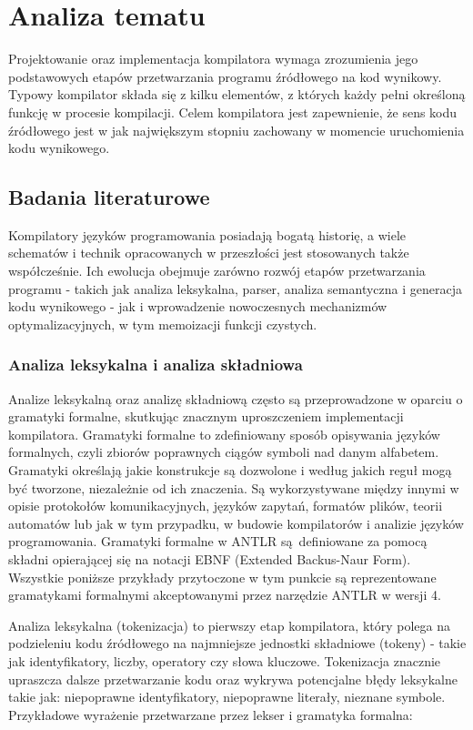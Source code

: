 \chapter{Analiza tematu}
\label{ch:02}

Projektowanie oraz implementacja kompilatora wymaga zrozumienia jego podstawowych etapów przetwarzania programu źródłowego na kod wynikowy. Typowy kompilator składa się z kilku elementów, z których każdy pełni określoną funkcję w procesie kompilacji. Celem kompilatora jest zapewnienie, że sens kodu źródłowego jest w jak największym stopniu zachowany w momencie uruchomienia kodu wynikowego.


\section{Badania literaturowe}
Kompilatory języków programowania posiadają bogatą historię, a wiele schematów i technik opracowanych w przeszłości jest stosowanych także współcześnie. Ich ewolucja obejmuje zarówno rozwój etapów przetwarzania programu - takich jak analiza leksykalna, parser, analiza semantyczna i generacja kodu wynikowego - jak i wprowadzenie nowoczesnych mechanizmów optymalizacyjnych, w tym memoizacji funkcji czystych.

\subsection{Analiza leksykalna i analiza składniowa}
\label{ch:02-analiza-leks-i-syntax}

Analize leksykalną oraz analizę składniową często są przeprowadzone w oparciu o gramatyki formalne, skutkując znacznym uproszczeniem implementacji kompilatora. Gramatyki formalne \cite{bib:automata-theory-langs-and-computation} to zdefiniowany sposób opisywania języków formalnych, czyli zbiorów poprawnych ciągów symboli nad danym alfabetem. Gramatyki określają jakie konstrukcje są dozwolone i według jakich reguł mogą być tworzone, niezależnie od ich znaczenia. Są wykorzystywane między innymi w opisie protokołów komunikacyjnych, języków zapytań, formatów plików, teorii automatów lub jak w tym przypadku, w budowie kompilatorów i analizie języków programowania. Gramatyki formalne w ANTLR \cite{bib:antlr} są definiowane za pomocą składni opierającej się na notacji EBNF (Extended Backus-Naur Form). Wszystkie poniższe przykłady przytoczone w tym punkcie są reprezentowane gramatykami formalnymi akceptowanymi przez narzędzie ANTLR w wersji 4.

Analiza leksykalna (tokenizacja) to pierwszy etap kompilatora, który polega na podzieleniu kodu źródłowego na najmniejsze jednostki składniowe (tokeny) - takie jak identyfikatory, liczby, operatory czy słowa kluczowe. Tokenizacja znacznie upraszcza dalsze przetwarzanie kodu oraz wykrywa potencjalne błędy leksykalne takie jak: niepoprawne identyfikatory, niepoprawne literały, nieznane symbole. Przykładowe wyrażenie przetwarzane przez lekser i gramatyka formalna:


